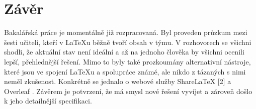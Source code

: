 \documentclass{article}
\begin{document}
\section{Závěr}
Bakalářská práce je momentálně již rozpracovaná. Byl proveden průzkum mezi šesti učiteli, kteří v LaTeXu běžně tvoří obsah v týmu. V rozhovorech se všichni shodli, že aktuální stav není ideální a až na jednoho člověka by všichni ocenili lepší, přehlednější řešení. Mimo to byly také prozkoumány alternativní nástroje, které jsou ve spojení LaTeXu a spolupráce známé, ale nikdo z tázaných s nimi neměl zkušenost. Konkrétně se jednalo o webové služby ShareLaTeX [2] a Overleaf \citep{cit4}. Závěrem je potvrzení, že má smysl nové řešení vyvíjet a zároveň došlo k jeho detailnější specifikaci. 



\end{document}
